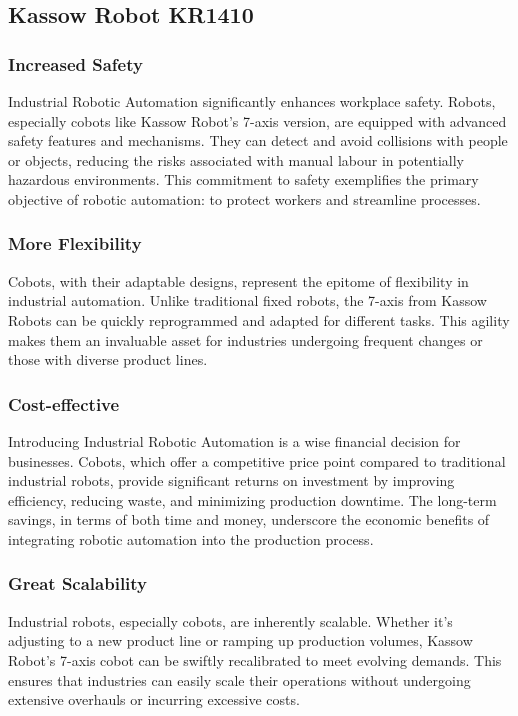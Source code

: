 \subsection{Kassow Robot KR1410}



\subsubsection{Increased Safety}

Industrial Robotic Automation significantly enhances workplace safety. Robots, especially cobots like Kassow Robot's 7-axis version, are equipped with advanced safety features and mechanisms. 
They can detect and avoid collisions with people or objects, reducing the risks associated with manual labour in potentially hazardous environments. This commitment to safety exemplifies the primary objective of robotic automation: to protect workers and streamline processes.

\subsubsection{More Flexibility}
Cobots, with their adaptable designs, represent the epitome of flexibility in industrial automation. 
Unlike traditional fixed robots, the 7-axis from Kassow Robots can be quickly reprogrammed and adapted for different tasks. This agility makes them an invaluable asset for industries undergoing frequent changes or those with diverse product lines.

\subsubsection{Cost-effective}
Introducing Industrial Robotic Automation is a wise financial decision for businesses. Cobots, which offer a competitive price point compared to traditional industrial robots, provide significant returns on investment by improving efficiency, reducing waste, and minimizing production downtime. 
The long-term savings, in terms of both time and money, underscore the economic benefits of integrating robotic automation into the production process.

\subsubsection{Great Scalability}
Industrial robots, especially cobots, are inherently scalable. Whether it's adjusting to a new product line or ramping up production volumes, Kassow Robot's 7-axis cobot can be swiftly recalibrated to meet evolving demands. 
This ensures that industries can easily scale their operations without undergoing extensive overhauls or incurring excessive costs.

